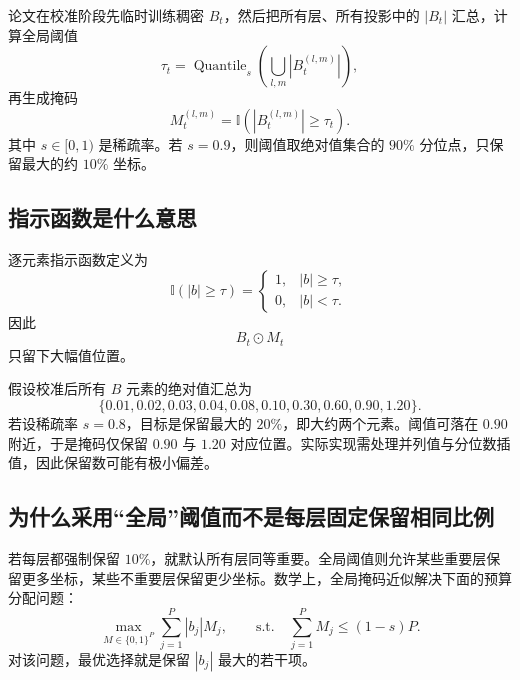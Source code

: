 \documentclass[UTF8,12pt,a4paper,fontset=none]{ctexart}
\numberwithin{equation}{section}
\newcommand{\Quantile}{\operatorname{Quantile}}
\begin{document}
论文在校准阶段先临时训练稠密 $B_t$，然后把所有层、所有投影中的 $|B_t|$ 汇总，计算全局阈值
\begin{equation}
  \tau_t
  =\Quantile_s\left(\bigcup_{l,m}\left|B_t^{(l,m)}\right|\right),
  \label{eq:tau}
\end{equation}
再生成掩码
\begin{equation}
  M_t^{(l,m)}
  =\mathbb{I}\left(
  \left|B_t^{(l,m)}\right|\ge \tau_t
  \right).
  \tag{2}
  \label{eq:paper2}
\end{equation}
其中 $s\in[0,1)$ 是稀疏率。若 $s=0.9$，则阈值取绝对值集合的 $90\%$ 分位点，只保留最大的约 $10\%$ 坐标。

\subsection{指示函数是什么意思}

逐元素指示函数定义为
\begin{equation}
  \mathbb{I}(|b|\ge\tau)=
  \begin{cases}
    1,& |b|\ge\tau,\\
    0,& |b|<\tau.
  \end{cases}
\end{equation}
因此
\begin{equation}
  B_t\odot M_t
\end{equation}
只留下大幅值位置。

\begin{examplebox}[一个简单的分位数例子]
假设校准后所有 $B$ 元素的绝对值汇总为
\begin{equation*}
  \{0.01,0.02,0.03,0.04,0.08,0.10,0.30,0.60,0.90,1.20\}.
\end{equation*}
若设稀疏率 $s=0.8$，目标是保留最大的 $20\%$，即大约两个元素。阈值可落在 $0.90$ 附近，于是掩码仅保留 $0.90$ 与 $1.20$ 对应位置。实际实现需处理并列值与分位数插值，因此保留数可能有极小偏差。
\end{examplebox}

\subsection{为什么采用“全局”阈值而不是每层固定保留相同比例}

若每层都强制保留 $10\%$，就默认所有层同等重要。全局阈值则允许某些重要层保留更多坐标，某些不重要层保留更少坐标。数学上，全局掩码近似解决下面的预算分配问题：
\begin{equation}
  \max_{M\in\{0,1\}^{P}}
  \sum_{j=1}^{P}|b_j|M_j,
  \qquad
  \text{s.t.}\quad \sum_{j=1}^{P}M_j\le (1-s)P.
  \label{eq:topk-budget}
\end{equation}
对该问题，最优选择就是保留 $|b_j|$ 最大的若干项。
\end{document}
